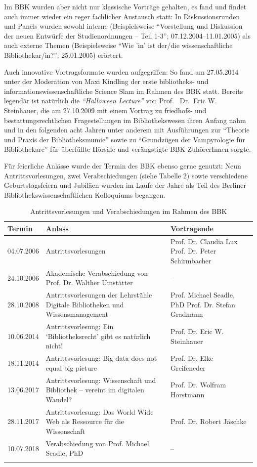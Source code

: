 \documentclass[a4paper,
fontsize=11pt,
oneside,
numbers=noperiodatend,
parskip=half-,
bibliography=totoc,
final
]{scrartcl}
\begin{document}
Im BBK wurden aber nicht nur klassische Vorträge gehalten, es fand und
findet auch immer wieder ein reger fachlicher Austausch statt: In
Diskussionsrunden und Panels wurden sowohl interne (Beispielsweise
\enquote{Vorstellung und Diskussion der neuen Entwürfe der
Studienordnungen -- Teil 1-3}; 07.12.2004--11.01.2005) als auch externe
Themen (Beispielsweise \enquote{Wie 'in' ist der/die wissenschaftliche
Bibliothekar/in?}; 25.01.2005) erörtert.

Auch innovative Vortragsformate wurden aufgegriffen: So fand am
27.05.2014 unter der Moderation von Maxi Kindling der erste bibliotheks-
und informationswissenschaftliche Science Slam im Rahmen des BBK statt.
Bereits legendär ist natürlich die \emph{\enquote{Halloween Lecture}}
von Prof.~ Dr.~Eric W. Steinhauer, die am 27.10.2009 mit einem Vortrag
zu friedhofs- und bestattungsrechtlichen Fragestellungen im
Bibliothekswesen ihren Anfang nahm und in den folgenden acht Jahren
unter anderem mit Ausführungen zur \enquote{Theorie und Praxis der
Bibliotheksmumie} sowie zu \enquote{Grundzügen der Vampyrologie für
Bibliothekare} für überfüllte Hörsäle und verängstigte BBK-ZuhörerInnen
sorgte.

Für feierliche Anlässe wurde der Termin des BBK ebenso gerne genutzt:
Neun Antrittsvorlesungen, zwei Verabschiedungen (siehe Tabelle 2) sowie
verschiedene Geburtstagsfeiern und Jubiläen wurden im Laufe der Jahre
als Teil des Berliner Bibliothekswissenschaftlichen Kolloquiums
begangen.

\begin{longtable}[]{@{}lp{8cm}p{5cm}@{}}
\tabularnewline
\toprule
\textbf{Termin} & \textbf{Anlass} & \textbf{Vortragende} \\
\midrule
04.07.2006 & Antrittsvorlesungen & Prof. Dr. Claudia Lux \newline Prof. Dr. Peter Schirmbacher \\
\midrule
24.10.2006 & Akademische Verabschiedung von Prof. Dr. Walther Umstätter & -- \\
\midrule
28.10.2008 & Antrittsvorlesungen der Lehrstühle Digitale Bibliotheken und Wissensmanagement & Prof. Michael Seadle, PhD \newline Prof. Dr. Stefan Gradmann \\
\midrule
10.06.2014 & Antrittsvorlesung: Ein ‘Bibliotheksrecht’ gibt es natürlich nicht! &
Prof. Dr. Eric W. Steinhauer \\
\midrule
18.11.2014 & Antrittsvorlesung: Big data does not equal big picture & Prof. Dr. Elke Greifeneder \\
\midrule
13.06.2017 & Antrittsvorlesung: Wissenschaft und Bibliothek – vereint im digitalen Wandel? & Prof. Dr. Wolfram Horstmann \\
\midrule
28.11.2017 & Antrittsvorlesung: Das World Wide Web als Ressource für die Wissenschaft & Prof. Dr. Robert Jäschke \\
\midrule
10.07.2018 & Verabschiedung von Prof. Michael Seadle, PhD & -- \\
\bottomrule
\caption{Antrittsvorlesungen und Verabschiedungen im Rahmen des
BBK}
\end{longtable}
\end{document}
